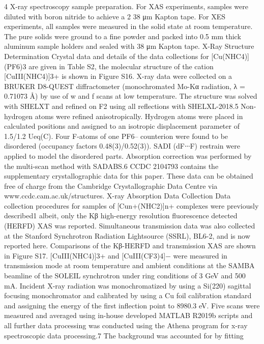 4 
X-ray spectroscopy sample preparation. For XAS experiments, samples were diluted with boron nitride to 
achieve a 2%
38 μm Kapton tape. For XES experiments, all samples were measured in the solid state at room temperature. 
The pure solids were ground to a fine powder and packed into 0.5 mm thick aluminum sample holders and sealed 
with 38 μm Kapton tape. 
X-Ray Structure Determination 
Crystal data and details of the data collections for [Cu(NHC4)](PF6)3 are given in Table S2, the molecular 
structure of the cation [CuIII(NHC4)]3+ is shown in Figure S16. X-ray data were collected on a BRUKER D8-QUEST 
diffractometer (monochromated Mo-Kα radiation, λ = 0.71073 Å) by use of w and f scans at low temperature. 
The structure was solved with SHELXT and refined on F2 using all reflections with SHELXL-2018.5 Non-hydrogen 
atoms were refined anisotropically. Hydrogen atoms were placed in calculated positions and assigned to an 
isotropic displacement parameter of 1.5/1.2 Ueq(C). Four F-atoms of one PF6– counterion were found to be 
disordered (occupancy factors 0.48(3)/0.52(3)). SADI (dF∙∙∙F) restrain were applied to model the disordered parts. 
Absorption correction was performed by the multi-scan method with SADABS.6 CCDC 2104793 contains the 
supplementary crystallographic data for this paper. These data can be obtained free of charge from the 
Cambridge Crystallographic Data Centre via www.ccdc.cam.ac.uk/structures. 
X-ray Absorption Data Collection 
Data collection procedures for samples of [Cun+(NHC2)]n+ complexes were previously described1 albeit, only 
the Kβ high-energy resolution fluorescence detected (HERFD) XAS was reported. Simultaneous transmission 
data was also collected at the Stanford Synchrotron Radiation Lightsource (SSRL), BL6-2, and is now reported 
here. Comparisons of the Kβ-HERFD and transmission XAS are shown in Figure S17. [CuIII(NHC4)]3+ and 
[CuIII(CF3)4]− were measured in transmission mode at room temperature and ambient conditions at the SAMBA 
beamline of the SOLEIL synchrotron under ring conditions of 3 GeV and 500 mA. Incident X-ray radiation was 
monochromatized by using a Si(220) 
 sagittal focusing monochromator and calibrated by using a Cu foil 
calibration standard and assigning the energy of the first inflection point to 8980.3 eV. Five scans were measured 
and averaged using in-house developed MATLAB R2019b scripts and all further data processing was conducted 
using the Athena program for x-ray spectroscopic data processing.7 The background was accounted for by fitting 
